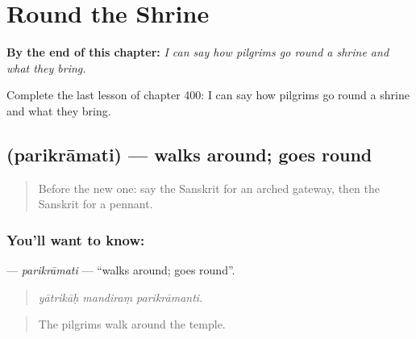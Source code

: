 
\chapter{Round the Shrine}
\label{ch:sa-round-the-shrine}

\begin{chapteropening}
\textbf{By the end of this chapter:} \emph{I can say how pilgrims go round a shrine and what they bring.}

Complete the last lesson of chapter 400: I can say how pilgrims go round a shrine and what they bring.
\end{chapteropening}

\section[\texorpdfstring{\sk{परिक्रामति} (parikrāmati)}{परिक्रामति (parikrāmati)}]{ (parikrāmati) — walks around; goes round}

\label{lesson:SA-C400-parikramati}



\begin{quote}
Before the new one: say the Sanskrit for an arched gateway, then the Sanskrit for a pennant.
\end{quote}

\subsection*{You'll want to know: }
\textbf{} — \emph{parikrāmati} — \textquotedblleft{}walks around; goes round\textquotedblright{}.

\begin{quote}
  
\end{quote}

\begin{quote}
\emph{yātrikāḥ mandiraṃ parikrāmanti.}
\end{quote}

\begin{quote}
The pilgrims walk around the temple.
\end{quote}

